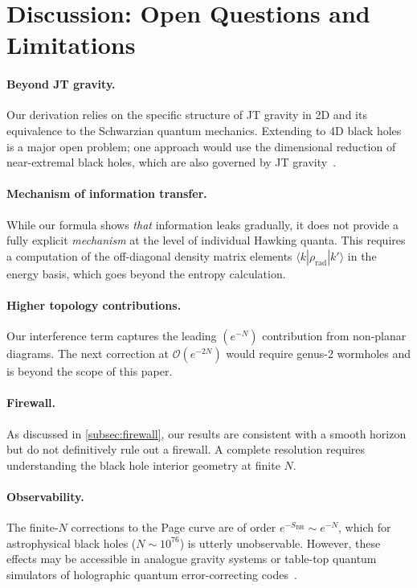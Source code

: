 \documentclass[12pt,a4paper]{article}
\newcommand{\SBH}{S_{\mathrm{BH}}}
\newcommand{\OO}{\mathcal{O}}
\begin{document}
\section{Discussion: Open Questions and Limitations}
\label{sec:open_questions}

\paragraph{Beyond JT gravity.}
Our derivation relies on the specific structure of JT gravity in 2D and its
equivalence to the Schwarzian quantum mechanics.  Extending to 4D black holes
is a major open problem; one approach would use the dimensional reduction of
near-extremal black holes, which are also governed by JT
gravity~\citep{Nayak2018}.

\paragraph{Mechanism of information transfer.}
While our formula shows \emph{that} information leaks gradually,
it does not provide a fully explicit \emph{mechanism} at the level of
individual Hawking quanta.  This requires a computation of the off-diagonal
density matrix elements $\langle k|\rho_{\mathrm{rad}}|k'\rangle$ in the
energy basis, which goes beyond the entropy calculation.

\paragraph{Higher topology contributions.}
Our interference term captures the leading $(e^{-N})$ contribution from
non-planar diagrams.  The next correction at $\OO(e^{-2N})$ would require
genus-2 wormholes and is beyond the scope of this paper.

\paragraph{Firewall.}
As discussed in \cref{subsec:firewall}, our results are consistent with a
smooth horizon but do not definitively rule out a firewall.  A complete
resolution requires understanding the black hole interior geometry at
finite $N$.

\paragraph{Observability.}
The finite-$N$ corrections to the Page curve are of order
$e^{-\SBH} \sim e^{-N}$, which for astrophysical black holes
($N \sim 10^{76}$) is utterly unobservable.  However, these effects may be
accessible in analogue gravity systems or table-top quantum simulators of
holographic quantum error-correcting codes~\citep{Almheiri2015}.
\end{document}
